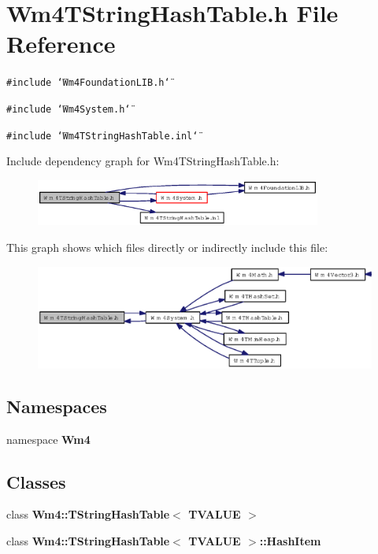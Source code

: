\section{Wm4TString\-Hash\-Table.h File Reference}
\label{Wm4TStringHashTable_8h}
{\tt \#include \char`\"{}Wm4Foundation\-LIB.h\char`\"{}}\par
{\tt \#include \char`\"{}Wm4System.h\char`\"{}}\par
{\tt \#include \char`\"{}Wm4TString\-Hash\-Table.inl\char`\"{}}\par


Include dependency graph for Wm4TString\-Hash\-Table.h:\begin{figure}[H]
\begin{center}
\leavevmode
\includegraphics[width=266pt]{Wm4TStringHashTable_8h__incl}
\end{center}
\end{figure}


This graph shows which files directly or indirectly include this file:\begin{figure}[H]
\begin{center}
\leavevmode
\includegraphics[width=358pt]{Wm4TStringHashTable_8h__dep__incl}
\end{center}
\end{figure}
\subsection*{Namespaces}
\begin{CompactItemize}
\item 
namespace {\bf Wm4}
\end{CompactItemize}
\subsection*{Classes}
\begin{CompactItemize}
\item 
class {\bf Wm4::TString\-Hash\-Table$<$ TVALUE $>$}
\item 
class \textbf{Wm4::TString\-Hash\-Table$<$ TVALUE $>$::Hash\-Item}
\end{CompactItemize}
